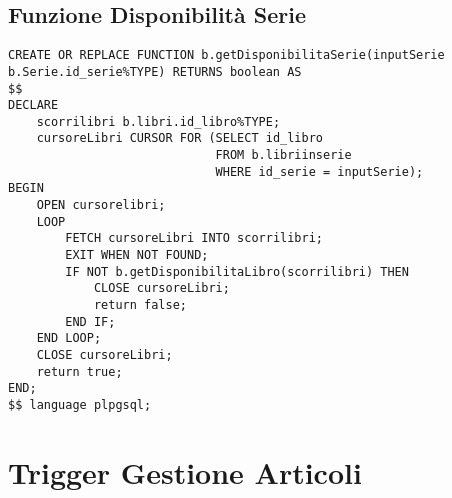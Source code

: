 \subsection{Funzione Disponibilità Serie}
\begin{lstlisting}
CREATE OR REPLACE FUNCTION b.getDisponibilitaSerie(inputSerie b.Serie.id_serie%TYPE) RETURNS boolean AS
$$
DECLARE
    scorrilibri b.libri.id_libro%TYPE;
    cursoreLibri CURSOR FOR (SELECT id_libro
                             FROM b.libriinserie
                             WHERE id_serie = inputSerie);
BEGIN
    OPEN cursorelibri;
    LOOP
        FETCH cursoreLibri INTO scorrilibri;
        EXIT WHEN NOT FOUND;
        IF NOT b.getDisponibilitaLibro(scorrilibri) THEN
            CLOSE cursoreLibri;
            return false;
        END IF;
    END LOOP;
    CLOSE cursoreLibri;
    return true;
END;
$$ language plpgsql;
\end{lstlisting}

\section{Trigger Gestione Articoli}
